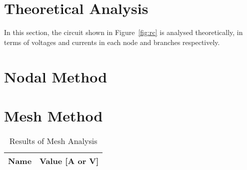 \section{Theoretical Analysis}
\label{sec:analysis}

In this section, the circuit shown in Figure~\ref{fig:rc} is analysed
theoretically, in terms of voltages and currents in each node and branches respectively.


\section{Nodal Method}






\section{Mesh Method}





\begin{table}[h]
  \centering
  \begin{tabular}{|l|r|}
    \hline
    {\bf Name} & {\bf Value [A or V]} \\ \hline
    
  \end{tabular}
  \caption{Results of Mesh Analysis}
  \label{tab:op_octave}
\end{table}




